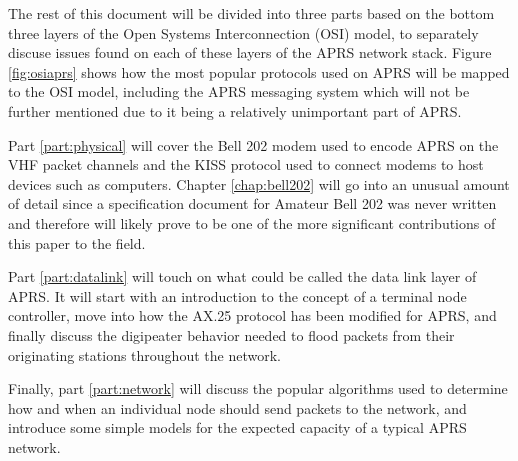 The rest of this document will be divided into three parts based on the
bottom three layers of the Open Systems Interconnection (OSI) model,
to separately discuse issues found on each of these layers of the APRS network stack.
Figure \ref{fig:osiaprs} shows how the most popular protocols used on APRS
will be mapped to the OSI model, including the APRS messaging system which
will not be further mentioned due to it being a relatively unimportant part of APRS.

Part \ref{part:physical} will cover the Bell 202 modem used to encode APRS on
the VHF packet channels and the KISS protocol used to connect modems to
host devices such as computers. Chapter \ref{chap:bell202} will go into an
unusual amount of detail since a specification document for Amateur Bell 202
was never written and therefore will likely prove to be one of the more significant
contributions of this paper to the field.

Part \ref{part:datalink} will touch on what could be called the data link layer
of APRS. It will start with an introduction to the concept of a terminal
node controller, move into how the AX.25 protocol has been modified for APRS, and
finally discuss the digipeater behavior needed to flood packets from their
originating stations throughout the network.

Finally, part \ref{part:network} will discuss the popular algorithms used to 
determine how and when an individual node should send packets to the network,
and introduce some simple models for the 
expected capacity of a typical APRS network.

